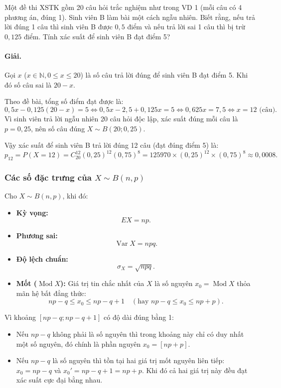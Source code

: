 \begin{vidu}[VD 2]
Một đề thi XSTK gồm 20 câu hỏi trắc nghiệm như trong VD 1 (mỗi câu có 4 phương án, đúng 1). Sinh viên B làm bài một cách ngẫu nhiên. Biết rằng, nếu trả lời đúng 1 câu thì sinh viên B được $0{,}5$ điểm và nếu trả lời sai 1 câu thì bị trừ $0{,}125$ điểm. Tính xác suất để sinh viên B đạt điểm 5?

\paragraph{Giải.}
Gọi $x$ ($x \in \mathbb{N}, 0 \le x \le 20$) là số câu trả lời đúng để sinh viên B đạt điểm 5. Khi đó số câu sai là $20 - x$.

Theo đề bài, tổng số điểm đạt được là:
\[
0{,}5x - 0{,}125(20 - x) = 5 \iff 0{,}5x - 2{,}5 + 0{,}125x = 5 \iff 0{,}625x = 7{,}5 \iff x = 12 \text{ (câu)}.
\]
Vì sinh viên trả lời ngẫu nhiên 20 câu hỏi độc lập, xác suất đúng mỗi câu là $p = 0{,}25$, nên số câu đúng $X \sim B(20; 0{,}25)$.

Vậy xác suất để sinh viên B trả lời đúng 12 câu (đạt đúng điểm 5) là:
\[
p_{12} = P(X = 12) = C_{20}^{12} (0{,}25)^{12} (0{,}75)^{8} = 125970 \times (0{,}25)^{12} \times (0{,}75)^8 \approx 0{,}0008.
\]
\end{vidu}

\subsubsection{Các số đặc trưng của \texorpdfstring{$X \sim B(n, p)$}{X ~ B(n, p)}}

\begin{tinhchat}
Cho $X \sim B(n, p)$, khi đó:
\begin{itemize}
    \item \textbf{Kỳ vọng:}
    \[
    EX = np.
    \]
    \item \textbf{Phương sai:}
    \[
    \operatorname{Var} X = npq.
    \]
    \item \textbf{Độ lệch chuẩn:}
    \[
    \sigma_X = \sqrt{npq}.
    \]
    \item \textbf{Mốt ($\operatorname{Mod} X$):} Giá trị tin chắc nhất của $X$ là số nguyên $x_0 = \operatorname{Mod} X$ thỏa mãn hệ bất đẳng thức:
    \[
    np - q \le x_0 \le np - q + 1 \quad (\text{hay } np - q \le x_0 \le np + p).
    \]
\end{itemize}
\end{tinhchat}

\begin{chuy}
Vì khoảng $[np - q; np - q + 1]$ có độ dài đúng bằng 1:
\begin{itemize}
    \item Nếu $np - q$ không phải là số nguyên thì trong khoảng này chỉ có duy nhất một số nguyên, đó chính là phần nguyên $x_0 = [np + p]$.
    \item Nếu $np - q$ là số nguyên thì tồn tại hai giá trị mốt nguyên liên tiếp: $x_0 = np - q$ và $x_0' = np - q + 1 = np + p$. Khi đó cả hai giá trị này đều đạt xác suất cực đại bằng nhau.
\end{itemize}
\end{chuy}

